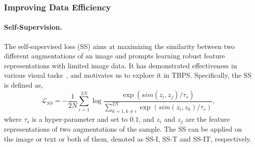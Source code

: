 \documentclass[letterpaper]{article} %
\begin{document}



\subsubsection{Improving Data Efficiency}
\paragraph{Self-Supervision.}
The self-supervised loss (SS) aims at maximizing the similarity between two different augmentations of an image and prompts learning robust feature representations with limited image data.
It has demonstrated effectiveness in various visual tasks~\cite{chen2020simple, chen2021exploring}, and motivates us to explore it in TBPS. 
Specifically, the SS is defined as,
\begin{equation}
\mathcal{L}_{SS} = -\frac{1}{2N} \sum_{i=1}^{2N} \log \frac{\exp(sim(z_i, z_j) / \tau_s)}{\sum_{k=1, k\neq i}^{2N} \exp(sim(z_i, z_k) / \tau_s)},
\end{equation}
where $\tau_s$ is a hyper-parameter and set to $0.1$, and $z_i$ and $z_j$ are the feature representations of two augmentations of the sample. 
The SS can be applied on the image or text or both of them, denoted as SS-I, SS-T and SS-IT, respectively. 

\end{document}
